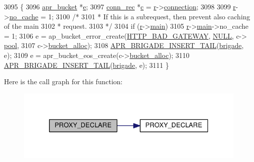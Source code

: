 \begin{DoxyCode}
3095 \{
3096     \hyperlink{structapr__bucket}{apr\_bucket} *\hyperlink{group__APR__Util__Bucket__Brigades_gacd90314acb2c2e5cd19681136c08efac}{e};
3097     \hyperlink{structconn__rec}{conn\_rec} *\hyperlink{group__APACHE__CORE__HTTPD_ga7cce37ef8558e46f408cb4d0f555605b}{c} = \hyperlink{group__APACHE__CORE__CONFIG_ga091cdd45984e865a888a4f8bb8fe107a}{r}->\hyperlink{structrequest__rec_a0924aae55826638314f76952ca5d60b1}{connection};
3098 
3099     \hyperlink{group__APACHE__CORE__CONFIG_ga091cdd45984e865a888a4f8bb8fe107a}{r}->\hyperlink{structrequest__rec_a9ab34a599dccdcf4f8161d0d06371a66}{no\_cache} = 1;
3100     \textcolor{comment}{/*}
3101 \textcolor{comment}{     * If this is a subrequest, then prevent also caching of the main}
3102 \textcolor{comment}{     * request.}
3103 \textcolor{comment}{     */}
3104     \textcolor{keywordflow}{if} (\hyperlink{group__APACHE__CORE__CONFIG_ga091cdd45984e865a888a4f8bb8fe107a}{r}->\hyperlink{structrequest__rec_aa15c110738953554b82619d8d2ee25b3}{main})
3105         \hyperlink{group__APACHE__CORE__CONFIG_ga091cdd45984e865a888a4f8bb8fe107a}{r}->\hyperlink{structrequest__rec_aa15c110738953554b82619d8d2ee25b3}{main}->no\_cache = 1;
3106     e = ap\_bucket\_error\_create(\hyperlink{group__HTTP__Status_ga57ddfb82346d6efc864c3e164e574b10}{HTTP\_BAD\_GATEWAY}, \hyperlink{pcre_8txt_ad7f989d16aa8ca809a36bc392c07fba1}{NULL}, c->
      \hyperlink{structconn__rec_a1dc5f31c7afc4a6f9c4ede0daea8cd1d}{pool},
3107                                c->\hyperlink{structconn__rec_a5a9ee4911c5a655131f76a04036fb4c0}{bucket\_alloc});
3108     \hyperlink{group__APR__Util__Bucket__Brigades_ga5447595f8374296c5ffe208db39b2f5d}{APR\_BRIGADE\_INSERT\_TAIL}(\hyperlink{group__MOD__PROXY_ga0a451b56abc335df106dcebf36975b0f}{brigade}, e);
3109     e = apr\_bucket\_eos\_create(c->\hyperlink{structconn__rec_a5a9ee4911c5a655131f76a04036fb4c0}{bucket\_alloc});
3110     \hyperlink{group__APR__Util__Bucket__Brigades_ga5447595f8374296c5ffe208db39b2f5d}{APR\_BRIGADE\_INSERT\_TAIL}(\hyperlink{group__MOD__PROXY_ga0a451b56abc335df106dcebf36975b0f}{brigade}, e);
3111 \}
\end{DoxyCode}


Here is the call graph for this function\+:
\nopagebreak
\begin{figure}[H]
\begin{center}
\leavevmode
\includegraphics[width=326pt]{group__MOD__PROXY_ga266cc69f805bdc4d8c39436c7af893d7_cgraph}
\end{center}
\end{figure}


